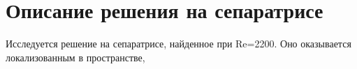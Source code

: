 \section{Описание решения на сепаратрисе}


Исследуется решение на сепаратрисе, найденное при Re=2200. Оно оказывается локализованным в пространстве, 
